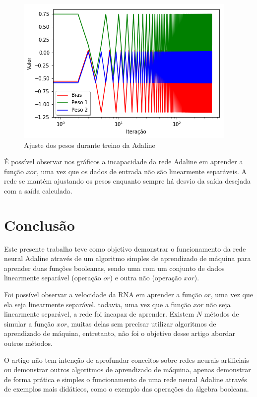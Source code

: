 \documentclass[a4paper,11pt]{article}
\begin{document}
			\begin{figure}[H]
				\centering
				\includegraphics[width=0.7\linewidth]{Figuras/Resultado04}
				\caption[Resultado XOR 02]{Ajuste dos pesos durante treino da Adaline}
				\label{fig:resultado04}
			\end{figure}
			
			É possível observar nos gráficos a incapacidade da rede Adaline em aprender a função $xor$, uma vez que os dados de entrada não são linearmente separáveis. A rede se mantém ajustando os pesos enquanto sempre há desvio da saída desejada com a saída calculada.
			
	\section{Conclusão}
	
		Este presente trabalho teve como objetivo demonstrar o funcionamento da rede neural Adaline através de um algoritmo simples de aprendizado de máquina para aprender duas funções booleanas, sendo uma com um conjunto de dados linearmente separável (operação $or$) e outra não (operação $xor$).
		
		Foi possível observar a velocidade da RNA em aprender a função $or$, uma vez que ela seja linearmente separável. todavia, uma vez que a função $xor$ não seja linearmente separável, a rede foi incapaz de aprender. Existem $N$ métodos de simular a função $xor$, muitas delas sem precisar utilizar algoritmos de aprendizado de máquina, entretanto, não foi o objetivo desse artigo abordar outros métodos.
		
		O artigo não tem intenção de aprofundar conceitos sobre redes neurais artificiais ou demonstrar outros algoritmos de aprendizado de máquina, apenas demonstrar de forma prática e simples o funcionamento de uma rede neural Adaline através de exemplos mais didáticos, como o exemplo das operações da álgebra booleana.
		
\end{document}
